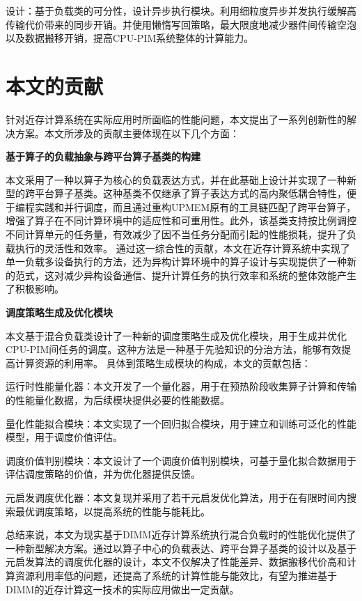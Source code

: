         设计：基于负载类的可分性，设计异步执行模块。利用细粒度异步并发执行缓解高传输代价带来的同步开销。并使用懒惰写回策略，最大限度地减少器件间传输空泡以及数据搬移开销，提高CPU-PIM系统整体的计算能力。
    
\section{本文的贡献}\label{sec:contributions}
针对近存计算系统在实际应用时所面临的性能问题，本文提出了一系列创新性的解决方案。本文所涉及的贡献主要体现在以下几个方面：

\textbf{基于算子的负载抽象与跨平台算子基类的构建}

本文采用了一种以算子为核心的负载表达方式，并在此基础上设计并实现了一种新型的跨平台算子基类。这种基类不仅继承了算子表达方式的高内聚低耦合特性，便于编程实践和并行调度，而且通过重构UPMEM原有的工具链匹配了跨平台算子，增强了算子在不同计算环境中的适应性和可重用性。此外，该基类支持按比例调控不同计算单元的任务量，有效减少了因不当任务分配而引起的性能损耗，提升了负载执行的灵活性和效率。 通过这一综合性的贡献，本文在近存计算系统中实现了单一负载多设备执行的方法，还为异构计算环境中的算子设计与实现提供了一种新的范式，这对减少异构设备通信、提升计算任务的执行效率和系统的整体效能产生了积极影响。

\textbf{调度策略生成及优化模块}

本文基于混合负载类设计了一种新的调度策略生成及优化模块，用于生成并优化CPU-PIM间任务的调度。这种方法是一种基于先验知识的分治方法，能够有效提高计算资源的利用率。 具体到策略生成模块的构成，本文的贡献包括： 

	运行时性能量化器：本文开发了一个量化器，用于在预热阶段收集算子计算和传输的性能量化数据，为后续模块提供必要的性能数据。
 
	量化性能拟合模块：本文实现了一个回归拟合模块，用于建立和训练可泛化的性能模型，用于调度价值评估。 
 
	调度价值判别模块：本文设计了一个调度价值判别模块，可基于量化拟合数据用于评估调度策略的价值，并为优化器提供反馈。
 
        元启发调度优化器：本文复现并采用了若干元启发优化算法，用于在有限时间内搜索最优调度策略，以提高系统的性能与能耗比。
        
 总结来说，本文为现实基于DIMM近存计算系统执行混合负载时的性能优化提供了一种新型解决方案。通过以算子中心的负载表达、跨平台算子基类的设计以及基于元启发算法的调度优化器的设计，本文不仅解决了性能差异、数据搬移代价高和计算资源利用率低的问题，还提高了系统的计算性能与能效比，有望为推进基于DIMM的近存计算这一技术的实际应用做出一定贡献。
